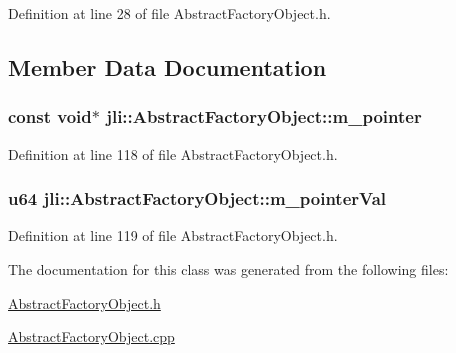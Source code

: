 Definition at line 28 of file Abstract\+Factory\+Object.\+h.



\subsection{Member Data Documentation}
\hypertarget{classjli_1_1_abstract_factory_object_ab543e65fa384673f153c01947e3573a1}{
\subsubsection[{m\+\_\+pointer}]{\setlength{\rightskip}{0pt plus 5cm}const void$\ast$ jli\+::\+Abstract\+Factory\+Object\+::m\+\_\+pointer}}\label{classjli_1_1_abstract_factory_object_ab543e65fa384673f153c01947e3573a1}


Definition at line 118 of file Abstract\+Factory\+Object.\+h.

\hypertarget{classjli_1_1_abstract_factory_object_a12422dceb4d3678e0c2beef4204538ea}{
\subsubsection[{m\+\_\+pointer\+Val}]{\setlength{\rightskip}{0pt plus 5cm}u64 jli\+::\+Abstract\+Factory\+Object\+::m\+\_\+pointer\+Val}}\label{classjli_1_1_abstract_factory_object_a12422dceb4d3678e0c2beef4204538ea}


Definition at line 119 of file Abstract\+Factory\+Object.\+h.



The documentation for this class was generated from the following files\+:\begin{DoxyCompactItemize}
\item 
\hyperlink{_abstract_factory_object_8h}{Abstract\+Factory\+Object.\+h}\item 
\hyperlink{_abstract_factory_object_8cpp}{Abstract\+Factory\+Object.\+cpp}\end{DoxyCompactItemize}
